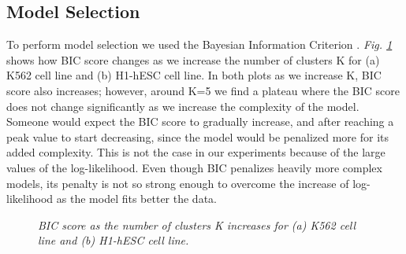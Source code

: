 \subsection{Model Selection} \label{meth-encode-model-subsect}
To perform model selection we used the Bayesian Information Criterion \citep{Schwarz1978}. \emph{Fig. \ref{model-BIC-pic}} shows how BIC score changes as we increase the number of clusters K for (a) K562 cell line and (b) H1-hESC cell line. In both plots as we increase K, BIC score also increases; however, around K=5 we find a plateau where the BIC score does not change significantly as we increase the complexity of the model. Someone would expect the BIC score to gradually increase, and after reaching a peak value to start decreasing, since the model would be penalized more for its added complexity. This is not the case in our experiments because of the large values of the log-likelihood. Even though BIC penalizes heavily more complex models, its penalty is not so strong enough to overcome the increase of log-likelihood as the model fits better the data. 
\begin{figure}[ht!]
     \begin{center}
    \end{center}
    \caption{\emph{BIC score as the number of clusters K increases for (a) K562 cell line and (b) H1-hESC cell line.}}
   \label{model-BIC-pic}
\end{figure}